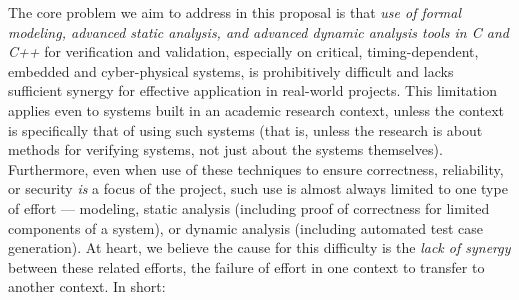 The core problem we aim to address in this proposal is that \emph{use of formal modeling, advanced static analysis, and advanced dynamic analysis tools in C and C++} for verification and validation, especially on critical, timing-dependent, embedded and cyber-physical systems, is prohibitively difficult and lacks sufficient synergy for effective application in real-world projects.  This limitation applies even to systems built in an academic research context, unless the context is specifically that of using such systems (that is, unless the research is about methods for verifying systems, not just about the systems themselves).  Furthermore, even when use of these techniques to ensure correctness, reliability, or security \emph{is} a focus of the project, such use is almost always limited to one type of effort --- modeling, static analysis (including proof of correctness for limited components of a system), or dynamic analysis (including automated test case generation).  At heart, we believe the cause for this difficulty is the \emph{lack of synergy} between these related efforts, the failure of effort in one context to transfer to another context.  In short:


